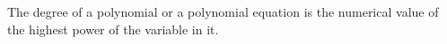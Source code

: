The degree of a polynomial or a polynomial equation is the numerical value of
the highest power of the variable in it.